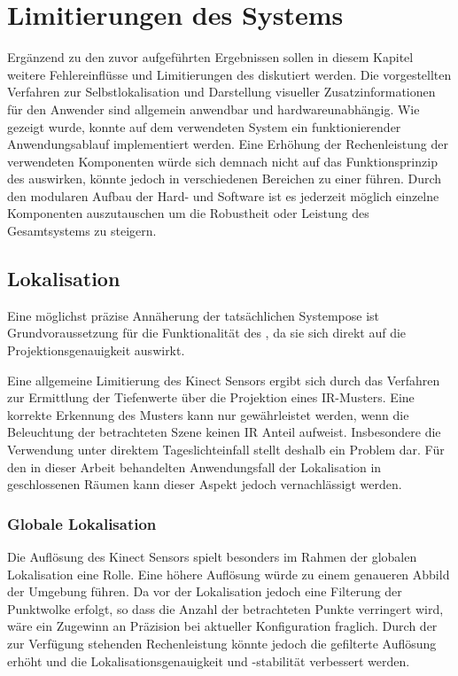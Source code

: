 \chapter{Limitierungen des Systems}
Ergänzend zu den zuvor aufgeführten Ergebnissen sollen in diesem Kapitel weitere Fehlereinflüsse und Limitierungen des  diskutiert werden. Die vorgestellten Verfahren zur Selbstlokalisation und Darstellung visueller Zusatzinformationen für den Anwender sind allgemein anwendbar und hardwareunabhängig. Wie gezeigt wurde, konnte auf dem verwendeten System ein funktionierender Anwendungsablauf implementiert werden. Eine Erhöhung der Rechenleistung der verwendeten Komponenten würde sich demnach nicht auf das Funktionsprinzip des  auswirken, könnte jedoch in verschiedenen Bereichen zu einer  führen. Durch den modularen Aufbau der Hard- und Software ist es jederzeit möglich einzelne Komponenten auszutauschen um die Robustheit oder Leistung des Gesamtsystems zu steigern.

\section{Lokalisation}
Eine möglichst präzise Annäherung der tatsächlichen Systempose ist Grundvoraussetzung für die Funktionalität des , da sie sich direkt auf die Projektionsgenauigkeit auswirkt.

Eine allgemeine Limitierung des Kinect Sensors ergibt sich durch das Verfahren zur Ermittlung der Tiefenwerte über die Projektion eines IR-Musters. Eine korrekte Erkennung des Musters kann nur gewährleistet werden, wenn die Beleuchtung der betrachteten Szene keinen \red[starken] IR Anteil aufweist. Insbesondere die Verwendung unter direktem Tageslichteinfall stellt deshalb ein Problem dar. Für den in dieser Arbeit behandelten Anwendungsfall der Lokalisation in geschlossenen Räumen kann dieser Aspekt jedoch vernachlässigt werden.

\subsection{Globale Lokalisation}
Die Auflösung des Kinect Sensors spielt besonders im Rahmen der globalen Lokalisation eine Rolle. Eine höhere Auflösung würde zu einem genaueren Abbild der Umgebung führen. Da vor der Lokalisation jedoch eine Filterung der Punktwolke erfolgt, so dass die Anzahl der betrachteten Punkte verringert wird, wäre ein Zugewinn an Präzision bei aktueller Konfiguration fraglich. Durch \red[Steigerung] der zur Verfügung stehenden Rechenleistung könnte jedoch die gefilterte Auflösung erhöht und die Lokalisationsgenauigkeit und -stabilität verbessert werden.\\

